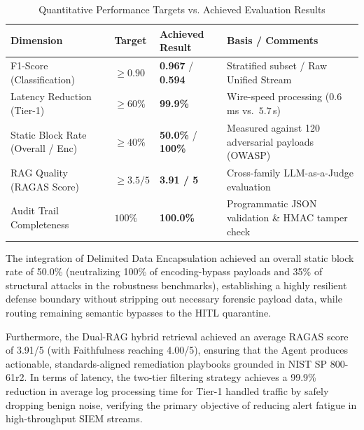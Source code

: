 \documentclass[12pt,a4paper]{article}
\begin{document}
\begin{table}[H]
    \centering
    \setlength{\tabcolsep}{4pt}
    \caption{Quantitative Performance Targets vs. Achieved Evaluation Results}
    \label{tab:targets}
    \begin{tabular}{>{\raggedright\arraybackslash}p{3.2cm}ll>{\raggedright\arraybackslash}p{5.5cm}}
        \toprule
        \textbf{Dimension}            & \textbf{Target} & \textbf{Achieved Result} & \textbf{Basis / Comments}                              \\
        \midrule
        F1-Score (Classification)     & $\geq 0.90$     & \textbf{0.967} / \textbf{0.594} & Stratified subset / Raw Unified Stream                 \\
        Latency Reduction (Tier-1)    & $\geq 60\%$     & \textbf{99.9\%}          & Wire-speed processing ($0.6$\,ms vs.\ $5.7$\,s)        \\
        Static Block Rate (Overall / Enc)& $\geq 40\%$     & \textbf{50.0\%} / \textbf{100\%} & Measured against 120 adversarial payloads (OWASP)     \\
        RAG Quality (RAGAS Score)     & $\geq 3.5 / 5$  & \textbf{3.91 / 5}         & Cross-family LLM-as-a-Judge evaluation                \\
        Audit Trail Completeness      & $100\%$         & \textbf{100.0\%}         & Programmatic JSON validation \& HMAC tamper check      \\
        \bottomrule
    \end{tabular}
\end{table}

The integration of Delimited Data Encapsulation achieved an overall static block rate of 50.0\% (neutralizing 100\% of encoding-bypass payloads and 35\% of structural attacks in the robustness benchmarks), establishing a highly resilient defense boundary without stripping out necessary forensic payload data, while routing remaining semantic bypasses to the HITL quarantine.

Furthermore, the Dual-RAG hybrid retrieval achieved an average RAGAS score of 3.91/5 (with Faithfulness reaching 4.00/5), ensuring that the Agent produces actionable, standards-aligned remediation playbooks grounded in NIST SP 800-61r2. In terms of latency, the two-tier filtering strategy achieves a 99.9\% reduction in average log processing time for Tier-1 handled traffic by safely dropping benign noise, verifying the primary objective of reducing alert fatigue in high-throughput SIEM streams.
\end{document}
